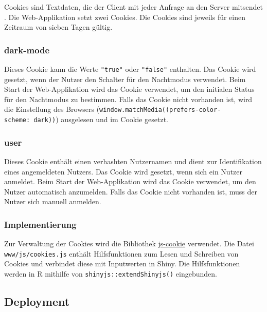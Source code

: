 \documentclass[
]{article}
\begin{document}
Cookies sind Textdaten, die der Client mit jeder Anfrage an den Server mitsendet \autocite{cookies}. Die Web-Applikation setzt zwei Cookies. Die Cookies sind jeweils für einen Zeitraum von sieben Tagen gültig.

\hypertarget{dark-mode}{%
\subsubsection{dark-mode}\label{dark-mode}}

Dieses Cookie kann die Werte \texttt{"true"} oder \texttt{"false"} enthalten. Das Cookie wird gesetzt, wenn der Nutzer den Schalter für den Nachtmodus verwendet. Beim Start der Web-Applikation wird das Cookie verwendet, um den initialen Status für den Nachtmodus zu bestimmen. Falls das Cookie nicht vorhanden ist, wird die Einstellung des Browsers (\texttt{window.matchMedia(\textquotesingle{}(prefers-color-scheme:\ dark)\textquotesingle{})}) ausgelesen und im Cookie gesetzt.

\hypertarget{user-1}{%
\subsubsection{user}\label{user-1}}

Dieses Cookie enthält einen verhashten Nutzernamen und dient zur Identifikation eines angemeldeten Nutzers. Das Cookie wird gesetzt, wenn sich ein Nutzer anmeldet. Beim Start der Web-Applikation wird das Cookie verwendet, um den Nutzer automatisch anzumelden. Falls das Cookie nicht vorhanden ist, muss der Nutzer sich manuell anmelden.

\hypertarget{implementierung}{%
\subsubsection{Implementierung}\label{implementierung}}

Zur Verwaltung der Cookies wird die Bibliothek \href{https://github.com/js-cookie/js-cookie}{js-cookie} \autocite{js-cookie} verwendet. Die Datei \texttt{www/js/cookies.js} enthält Hilfsfunktionen zum Lesen und Schreiben von Cookies und verbindet diese mit Inputwerten in Shiny. Die Hilfsfunktionen werden in R mithilfe von \texttt{shinyjs::extendShinyjs()} eingebunden.

\hypertarget{deployment-1}{%
\subsection{Deployment}\label{deployment-1}}
\end{document}
